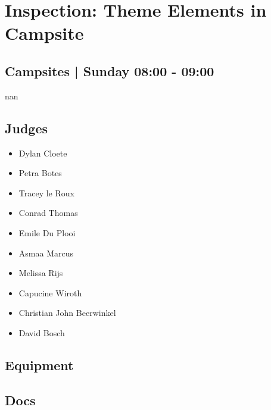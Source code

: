 \documentclass[10pt]{article}
\begin{document}
		\begin{minipage}{\linewidth}
		\setcounter{section}{30}
	\section{Inspection: Theme Elements in Campsite }
	\subsection*{Campsites | Sunday 08:00 - 09:00}

	nan

	\begin{multicols}{2}
	\subsection*{\faUsers \: Judges}
	\begin{itemize}
			\item Dylan Cloete
			\item Petra Botes
			\item Tracey le Roux
			\item Conrad Thomas
			\item Emile Du Plooi
			\item Asmaa Marcus
			\item Melissa Rijs
			\item Capucine Wiroth
			\item Christian John Beerwinkel
			\item David Bosch
		\end{itemize}
	\columnbreak
	\subsection*{\faWrench \: Equipment}
	        \vfill\null
        \subsection*{\faFile \: Docs}
     	\end{multicols}


	\vspace{1cm}
	\end{minipage}
\end{document}
